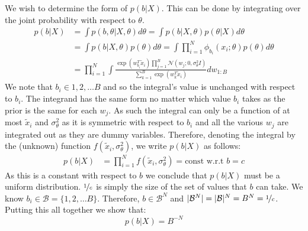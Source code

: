 \documentclass{article}
\newcommand{\Gaussian}{\mathcal{N}}
\begin{document}
We wish to determine the form of $p(b| X)$. This can be done by integrating over the joint probability with respect to $\theta$.
%
\begin{align*}
	p(b | X) &= \int p(b , \theta| X, \theta) d\theta = \int p(b | X, \theta) p(\theta | X) d\theta \\
	&=\int p(b | X, \theta) p(\theta) d\theta = \int \prod_{i=1}^{N} \phi_{b_i}(x_i; \theta) p(\theta) d\theta \\
	&= \prod_{i=1}^{N} \int \frac{\exp(w_{b_i}^T \tilde{x}_i) \prod_{j=1}^{B} \Gaussian(w_j; 0, \sigma_\theta^2 I)}{\sum_{k=1}^{B} \exp(w_{k}^T \tilde{x}_i)} dw_{1:B}
\end{align*}
%
We note that $b_i \in {1, 2, \dots B}$ and so the integral's value is unchanged with respect to $b_i$. The integrand has the same form no matter which value $b_i$ takes as the prior is the same for each $w_j$. As such the integral can only be a function of at most $\tilde{x}_i$ and $\sigma_\theta^2$ as it is symmetric with respect to $b_i$ and all the various $w_j$ are integrated out as they are dummy variables. Therefore, denoting the integral by the (unknown) function $f(\tilde{x}_i, \sigma_\theta^2)$, we write $p(b| X)$ as follows:
%
\begin{align*}
	p(b | X) &= \prod_{i=1}^{N} f(\tilde{x}_i, \sigma_\theta^2) = \textrm{const w.r.t } b = c
\end{align*}
%
As this is a constant with respect to $b$ we conclude that $p(b | X)$ must be a uniform distribution. $\nicefrac{1}{c}$ is simply the size of the set of values that $b$ can take. We know $b_i \in \mathcal{B} = \{1, 2, \dots B\}$. Therefore, $b \in \mathcal{B}^N$ and $|\mathcal{B}^N| = |\mathcal{B}|^N = B^N= \nicefrac{1}{c}$. Putting this all together we show that:
%
\begin{equation}
	p(b | X) = B^{-N}
\end{equation}
\end{document}
